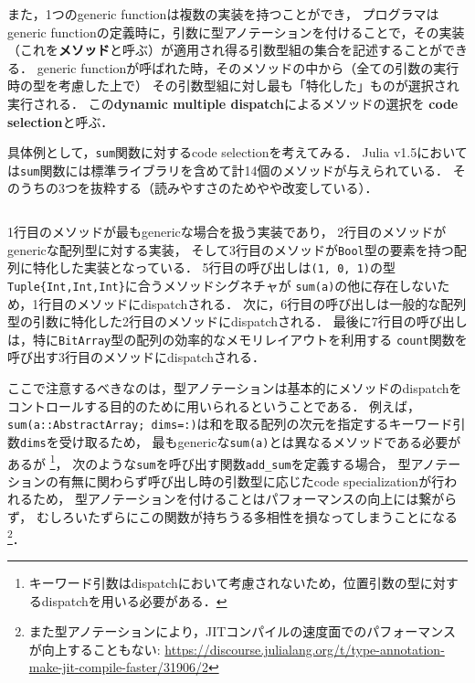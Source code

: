 また，1つのgeneric functionは複数の実装を持つことができ，
プログラマはgeneric functionの定義時に，引数に型アノテーションを付けることで，その実装
（これを\textbf{メソッド}と呼ぶ）が適用され得る引数型組の集合を記述することができる．
generic functionが呼ばれた時，そのメソッドの中から（全ての引数の実行時の型を考慮した上で）
その引数型組に対し最も「特化した\footnotemark」ものが選択され実行される．
この\textbf{dynamic multiple dispatch}によるメソッドの選択を
\textbf{code selection}と呼ぶ．


具体例として，\verb|sum|関数に対するcode selectionを考えてみる．
Julia v1.5においては\verb|sum|関数には標準ライブラリを含めて計14個のメソッドが与えられている．
そのうちの3つを抜粋する（読みやすさのためやや改変している）．

\inputminted[frame=lines, linenos]{julia}{src/sums_method.jl}

1行目のメソッドが最もgenericな場合を扱う実装であり，
2行目のメソッドがgenericな配列型に対する実装，
そして3行目のメソッドが\verb|Bool|型の要素を持つ配列に特化した実装となっている．
5行目の呼び出しは\verb|(1, 0, 1)|の型\verb|Tuple{Int,Int,Int}|に合うメソッドシグネチャが
\verb|sum(a)|の他に存在しないため，1行目のメソッドにdispatchされる．
次に，6行目の呼び出しは一般的な配列型の引数に特化した2行目のメソッドにdispatchされる．
最後に7行目の呼び出しは，特に\verb|BitArray|型の配列の効率的なメモリレイアウトを利用する
\verb|count|関数を呼び出す3行目のメソッドにdispatchされる．

ここで注意するべきなのは，型アノテーションは基本的にメソッドのdispatchをコントロールする目的のために用いられるということである．
例えば，\verb|sum(a::AbstractArray; dims=:)|は和を取る配列の次元を指定するキーワード引数\verb|dims|を受け取るため，
最もgenericな\verb|sum(a)|とは異なるメソッドである必要があるが
\footnote{
  キーワード引数はdispatchにおいて考慮されないため，位置引数の型に対するdispatchを用いる必要がある．
}，
次のような\verb|sum|を呼び出す関数\verb|add_sum|を定義する場合，
型アノテーションの有無に関わらず呼び出し時の引数型に応じたcode specializationが行われるため，
型アノテーションを付けることはパフォーマンスの向上には繋がらず，
むしろいたずらにこの関数が持ちうる多相性を損なってしまうことになる
\footnote{
  また型アノテーションにより，JITコンパイルの速度面でのパフォーマンスが向上することもない:
  \url{https://discourse.julialang.org/t/type-annotation-make-jit-compile-faster/31906/2}
}．

